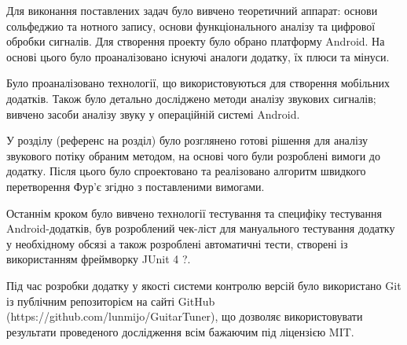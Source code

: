 
Для виконання поставлених задач було вивчено теоретичний аппарат: основи сольфеджио та нотного запису, основи функціонального аналізу та цифрової обробки сигналів. Для створення проекту було обрано платформу Android. На основі цього було проаналізовано існуючі аналоги додатку, їх плюси та мінуси. 

Було проаналізовано технології, що використовуються для створення мобільних додатків. Також було детально досліджено методи аналізу звукових сигналів; вивчено засоби аналізу звуку у операційній системі Android. 

У розділу (референс на розділ) було розглянено готові рішення для аналізу звукового потіку обраним методом, на основі чого були розроблені вимоги до додатку. Після цього було спроектовано та реалізовано алгоритм швидкого перетворення Фур'є згідно з поставленими вимогами. 

Останнім кроком було вивчено технології тестування та специфіку тестування Android-додатків, був розроблений чек-ліст для мануального тестування додатку у необхідному обсязі а також розроблені автоматичні тести, створені із використанням фреймворку JUnit 4 ?.

Під час розробки додатку у якості системи контролю версій було використано Git із публічним репозиторієм на сайті GitHub (https://github.com/lunmijo/GuitarTuner), що дозволяє використовувати результати проведеного дослідження всім бажаючим під ліцензією MIT.